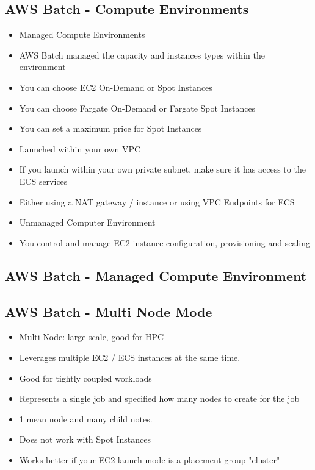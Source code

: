 \subsection{AWS Batch - Compute Environments}
\begin{itemize}
    \item Managed Compute Environments
    \item AWS Batch managed the capacity and instances types within the environment
    \item You can choose EC2 On-Demand or Spot Instances
    \item You can choose Fargate On-Demand or Fargate Spot Instances
    \item You can set a maximum price for Spot Instances
    \item Launched within your own VPC
    \item If you launch within your own private subnet, make sure it has access to the ECS services
    \item Either using a NAT gateway / instance or using VPC Endpoints for ECS
    \item Unmanaged Computer Environment
    \item You control and manage EC2 instance configuration, provisioning and scaling
\end{itemize}

\subsection{AWS Batch - Managed Compute Environment}

\subsection{AWS Batch - Multi Node Mode}
\begin{itemize}
    \item Multi Node: large scale, good for HPC
    \item Leverages multiple EC2 / ECS instances at the same time.
    \item Good for tightly coupled workloads
    \item Represents a single job and specified how many nodes to create for the job
    \item 1 mean node and many child notes.
    \item Does not work with Spot Instances
    \item Works better if your EC2 launch mode is a placement group "cluster"
\end{itemize}


